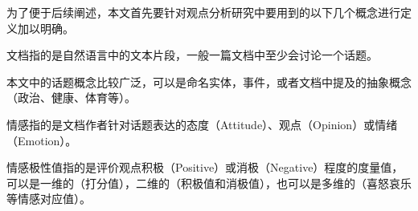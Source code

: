 为了便于后续阐述，本文首先要针对观点分析研究中要用到的以下几个概念进行定义加以明确。
\begin{definition}[文档(Document)]
文档指的是自然语言中的文本片段，一般一篇文档中至少会讨论一个话题。
\end{definition}

\begin{definition}[话题(Topic)]
本文中的话题概念比较广泛，可以是命名实体，事件，或者文档中提及的抽象概念（政治、健康、体育等）。
\end{definition}

\begin{definition}[情感(Sentiment)]
情感指的是文档作者针对话题表达的态度（Attitude）、观点（Opinion）或情绪（Emotion）。
\end{definition}

\begin{definition}
情感极性值指的是评价观点积极（Positive）或消极（Negative）程度的度量值，可以是一维的（打分值），二维的（积极值和消极值），也可以是多维的（喜怒哀乐等情感对应值）。
\end{definition}

